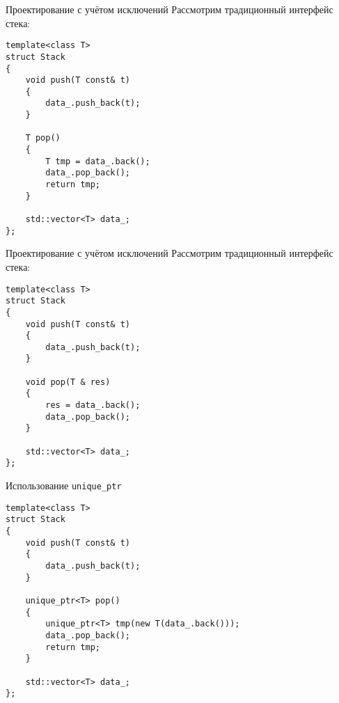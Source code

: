 \documentclass[aspectration=1610,t]{beamer}
\begin{document}
\begin{frame}[fragile]{Проектирование с учётом исключений}
    Рассмотрим традиционный интерфейс стека:
\begin{lstlisting}
template<class T> 
struct Stack 
{
    void push(T const& t) 
    { 
        data_.push_back(t); 
    }

    T pop() 
    {
        T tmp = data_.back();
        data_.pop_back();
        return tmp;
    }

    std::vector<T> data_;
};
\end{lstlisting}
\end{frame}

\begin{frame}[fragile]{Проектирование с учётом исключений}
    Рассмотрим традиционный интерфейс стека:
\begin{lstlisting}
template<class T> 
struct Stack 
{
    void push(T const& t) 
    { 
        data_.push_back(t); 
    }

    void pop(T & res) 
    {
        res = data_.back();
        data_.pop_back();
    }

    std::vector<T> data_;
};
\end{lstlisting}
\end{frame}

\begin{frame}[fragile]{Использование {\tt unique\_ptr}}
\begin{lstlisting}
template<class T> 
struct Stack 
{
    void push(T const& t) 
    { 
        data_.push_back(t); 
    }

    unique_ptr<T> pop() 
    {
        unique_ptr<T> tmp(new T(data_.back()));
        data_.pop_back();
        return tmp;
    }

    std::vector<T> data_;
};
\end{lstlisting}
\end{frame}


%
%
%
\end{document}
